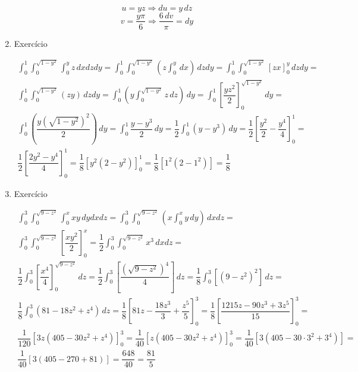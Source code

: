 \begin{enumerate}
\begin{gather*}
	\end{gather*}
	\begin{equation*}
		u = yz \Rightarrow du = y\, dz
	\end{equation*}
	\begin{equation*}
		v = \dfrac{y\pi}{6} \Rightarrow \dfrac{6\, dv}{\pi} = dy
	\end{equation*}
	
	\item Exercício
	
	\begin{gather*}
			\int_0^1 \int_0^{\sqrt{1 - y^2}} \int_0^y z\, dxdzdy = \int_0^1 \int_0^{\sqrt{1 - y^2}}\left(z\int_0^y\, dx\right)\,dzdy = \int_0^1 \int_0^{\sqrt{1 - y^2}} \left[zx\right]_0^y\,dzdy =\\ \int_0^1 \int_0^{\sqrt{1 - y^2}} \left(zy\right)\,dzdy = \int_0^1\left(y\int_0^{\sqrt{1 - y^2}} z\, dz\right)\,dy = \int_0^1 \left[\dfrac{yz^2}{2}\right]_0^{\sqrt{1 - y^2}}\,dy =\\ \int_0^1\left(\dfrac{y\left(\sqrt{1 - y^2}\right)^2}{2}\right)\,dy = \int_0^1\dfrac{y - y^3}{2}\, dy = \dfrac{1}{2}\int_0^1\left(y - y^3\right)\, dy = \dfrac{1}{2} \left[\dfrac{y^2}{2} - \dfrac{y^4}{4}\right]_0^1 =\\ \dfrac{1}{2} \left[\dfrac{2y^2 - y^4}{4}\right]_0^1 = \dfrac{1}{8}\left[y^2\left(2 - y^2\right)\right]_0^1 = \dfrac{1}{8}\left[1^2\left(2 - 1^2\right)\right] = \dfrac{1}{8}
	\end{gather*}
	
	\item Exercício
	
	\begin{gather*}
		\int_0^3 \int_0^{\sqrt{9 - z^2}} \int_0^x xy\, dydxdz = \int_0^3 \int_0^{\sqrt{9 - z^2}} \left(x\int_0^x y\, dy\right)\, dxdz =\\ \int_0^3 \int_0^{\sqrt{9 - z^2}} \left[\dfrac{xy^2}{2}\right]_0^x = \dfrac{1}{2}\int_0^3 \int_0^{\sqrt{9 - z^2}} x^3\, dxdz =\\ \dfrac{1}{2}\int_0^3 \left[\dfrac{x^4}{4}\right]_0^{\sqrt{9 - z^2}}\, dz = \dfrac{1}{2}\int_0^3 \left[\dfrac{\left(\sqrt{9 - z^2}\right)^4}{4}\right]\, dz = \dfrac{1}{8}\int_0^3 \left[\left(9 - z^2\right)^2\right]\, dz =\\ \dfrac{1}{8}\int_0^3 \left(81 - 18z^2 + z^4\right)\, dz = \dfrac{1}{8}\left[81z - \dfrac{18z^3}{3} + \dfrac{z^5}{5}\right]_0^3 = \dfrac{1}{8}\left[\dfrac{1215z - 90z^3 + 3z^5}{15}\right]_0^3 =\\ \dfrac{1}{120}\left[3z\left(405 - 30z^2 + z^4\right)\right]_0^3 = \dfrac{1}{40}\left[z\left(405 - 30z^2 + z^4\right)\right]_0^3 = \dfrac{1}{40}\left[3\left(405 - 30\cdot3^2 + 3^4\right)\right] =\\ \dfrac{1}{40}\left[3\left(405 - 270 + 81\right)\right] = \dfrac{648}{40} = \dfrac{81}{5}
	\end{gather*}
\end{enumerate}